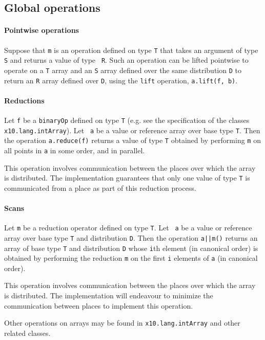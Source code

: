 

\subsection{Global operations }
\paragraph{Pointwise operations}\label{ArrayPointwise}
Suppose that {\tt m} is an operation defined on type {\tt T} that
takes an argument of type {\tt S} and returns a value of type {\tt
R}. Such an operation can be lifted pointwise to operate on a {\tt T}
array and an {\tt S} array defined over the same distribution {\tt D}
to return an {\tt R} array defined over {\tt D}, using the
{\tt lift} operation, {\tt a.lift(f, b)}.


\paragraph{Reductions}\label{ArrayReductions}

Let {\tt f} be a {\tt binaryOp} defined on type {\tt T} (e.g.{} see
the specification of the classes {\tt x10.lang.intArray}).  Let {\tt
a} be a value or reference array over base type {\tt T}. Then the
operation {\tt a.reduce(f)} returns a value of type {\tt T} obtained
by performing {\tt m} on all points in {\tt a} in some order, and in
parallel.

This operation involves communication between the places over which
the array is distributed. The \Xten{} implementation guarantees that
only one value of type {\tt T} is communicated from a place as part of
this reduction process.

\paragraph{Scans}\label{ArrayScans}

Let {\tt m} be a reduction operator defined on type {\tt T}. Let {\tt
a} be a value or reference array over base type {\tt T} and
distribution {\tt D}. Then the operation {\tt a||m()} returns an array
of base type {\tt T} and distribution {\tt D} whose {\tt i}th element
(in canonical order) is obtained by performing the reduction {\tt m}
on the first {\tt i} elements of {\tt a} (in canonical order).

This operation involves communication between the places over which
the array is distributed. The \Xten{} implementation will endeavour to
minimize the communication between places to implement this operation.

Other operations on arrays may be found in {\tt x10.lang.intArray} and
other related classes.
